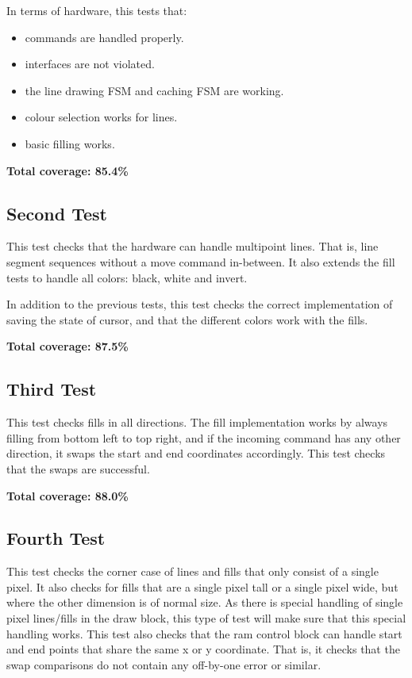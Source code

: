 \documentclass[]{article}
\begin{document}
In terms of hardware, this tests that:
\begin{itemize}
	\item commands are handled properly.
	\item interfaces are not violated.
	\item the line drawing FSM and caching FSM are working.
	\item colour selection works for lines.
	\item basic filling works.
\end{itemize}

\textbf{Total coverage: 85.4\%}


\subsection{Second Test} %
\label{sub:second_test}
This test checks that the hardware can handle multipoint lines. That is, line segment sequences without a move command in-between. It also extends the fill tests to handle all colors: black, white and invert.

In addition to the previous tests, this test checks the correct implementation of saving the state of cursor, and that the different colors work with the fills.

\textbf{Total coverage: 87.5\%}


\subsection{Third Test} %
\label{sub:third_test}

This test checks fills in all directions. The fill implementation works by always filling from bottom left to top right, and if the incoming command has any other direction, it swaps the start and end coordinates accordingly. This test checks that the swaps are successful.

\textbf{Total coverage: 88.0\%}


\subsection{Fourth Test} %
\label{sub:fourth_test}

This test checks the corner case of lines and fills that only consist of a single pixel. It also checks for fills that are a single pixel tall or a single pixel wide, but where the other dimension is of normal size.
As there is special handling of single pixel lines/fills in the draw block, this type of test will make sure that this special handling works.
This test also checks that the ram control block can handle start and end points that share the same x or y coordinate. That is, it checks that the swap comparisons do not contain any off-by-one error or similar.
\end{document}
